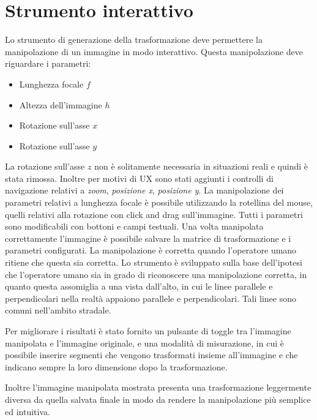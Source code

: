 \section{Strumento interattivo}
Lo strumento di generazione della trasformazione deve permettere la manipolazione di un immagine in modo interattivo.
Questa manipolazione deve riguardare i parametri:
\begin{itemize}
    \item Lunghezza focale $f$
    \item Altezza dell'immagine $h$
    \item Rotazione sull'asse $x$
    \item Rotazione sull'asse $y$
\end{itemize}
La rotazione sull'asse $z$ non è solitamente necessaria in situazioni reali e quindi è stata rimossa.
Inoltre per motivi di UX sono stati aggiunti i controlli di navigazione relativi a \emph{zoom}, \emph{posizione x}, \emph{posizione y}.
La manipolazione dei parametri relativi a lunghezza focale è possibile utilizzando la rotellina del mouse, quelli relativi alla rotazione con click and drag sull'immagine.
Tutti i parametri sono modificabili con bottoni e campi testuali.
Una volta manipolata correttamente l'immagine è possibile salvare la matrice di trasformazione e i parametri configurati.
La manipolazione è corretta quando l'operatore umano ritiene che questa sia corretta. Lo strumento è sviluppato sulla base dell'ipotesi che l'operatore umano sia in grado di riconoscere una manipolazione corretta, in quanto questa assomiglia a una vista dall'alto, in cui le linee parallele e perpendicolari nella realtà appaiono parallele e perpendicolari. Tali linee sono comuni nell'ambito stradale.

Per migliorare i risultati è stato fornito un pulsante di toggle tra l'immagine manipolata e l'immagine originale, e una modalità di misurazione, in cui è possibile inserire segmenti che vengono trasformati insieme all'immagine e che indicano sempre la loro dimensione dopo la trasformazione.

Inoltre l'immagine manipolata mostrata presenta una trasformazione leggermente diversa da quella salvata finale in modo da rendere la manipolazione più semplice ed intuitiva.
